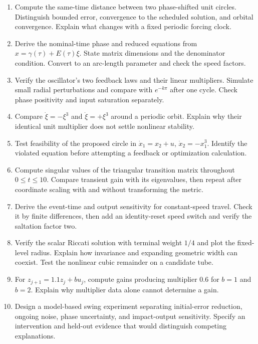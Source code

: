 \documentclass[12pt, openany]{book}
\theoremstyle{plain}
\begin{document}
\begin{enumerate}[itemsep=3pt,parsep=0pt]
\item Compute the same-time distance between two phase-shifted unit circles.
Distinguish bounded error, convergence to the scheduled solution, and orbital
convergence. Explain what changes with a fixed periodic forcing clock.
\item Derive the nominal-time phase and reduced equations from
$x=\gamma(\tau)+E(\tau)\xi$. State matrix dimensions and the denominator
condition. Convert to an arc-length parameter and check the speed factors.
\item Verify the oscillator's two feedback laws and their linear multipliers.
Simulate small radial perturbations and compare with $e^{-k\pi}$ after one
cycle. Check phase positivity and input saturation separately.
\item Compare $\dot\xi=-\xi^3$ and $\dot\xi=+\xi^3$ around a periodic orbit.
Explain why their identical unit multiplier does not settle nonlinear stability.
\item Test feasibility of the proposed circle in
$\dot x_1=x_2+u$, $\dot x_2=-x_1^3$. Identify the violated equation before
attempting a feedback or optimization calculation.
\item Compute singular values of the triangular transition matrix throughout
$0\leq t\leq10$. Compare transient gain with its eigenvalues, then repeat
after coordinate scaling with and without transforming the metric.
\item Derive the event-time and output sensitivity for constant-speed travel.
Check it by finite differences, then add an identity-reset speed switch and
verify the saltation factor two.
\item Verify the scalar Riccati solution with terminal weight $1/4$ and plot
the fixed-level radius. Explain how invariance and expanding geometric width
can coexist. Test the nonlinear cubic remainder on a candidate tube.
\item For $z_{j+1}=1.1z_j+b u_j$, compute gains producing multiplier $0.6$
for $b=1$ and $b=2$. Explain why multiplier data alone cannot determine a gain.
\item Design a model-based swing experiment separating initial-error reduction,
ongoing noise, phase uncertainty, and impact-output sensitivity. Specify an
intervention and held-out evidence that would distinguish competing explanations.
\end{enumerate}
\end{document}
